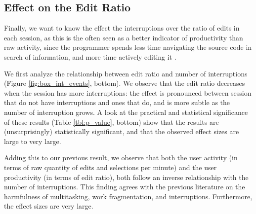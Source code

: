 \documentclass[times]{smrauth}
\begin{document}
\subsection{Effect on the Edit Ratio}
Finally, we want to know the effect the interruptions over the ratio of edits in each session, as this is the often seen as a better indicator of productivity than raw activity, since the programmer spends less time navigating the source code in search of information, and more time actively editing it \cite{KM06}.

We first analyze the relationship between edit ratio and number of interruptions (Figure \ref{fig:box_int_events}, bottom). We observe that the edit ratio decreases when the session has more interruptions: the effect is pronounced between session that do not have interruptions and ones that do, and is more subtle as the number of interruption grows. A look at the practical and statistical significance of these results (Table \ref{tbl:p_value}, bottom) show that the results are (unsurprisingly) statistically significant, and that the observed effect sizes are large to very large.

Adding this to our previous result, we observe that both the user activity (in terms of raw quantity of edits and selections per minute) and the user productivity (in terms of edit ratio), both follow an inverse relationship with the number of interruptions. This finding agrees with the previous literature on the harmfulness of multitasking, work fragmentation, and interruptions. Furthermore, the effect sizes are very large.

\end{document}

